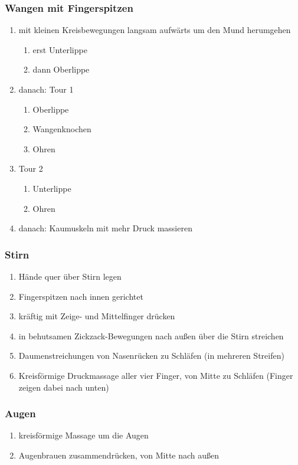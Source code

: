 \subsubsection{Wangen mit Fingerspitzen}
\begin{enumerate}
\item mit kleinen Kreisbewegungen langsam aufwärts um den Mund herumgehen
	\begin{enumerate}
	\item erst Unterlippe
	\item dann Oberlippe
	\end{enumerate}
\item danach: Tour 1
	\begin{enumerate}
	\item Oberlippe
	\item Wangenknochen
	\item Ohren
	\end{enumerate}
\item Tour 2
	\begin{enumerate}
	\item Unterlippe
	\item Ohren
	\end{enumerate}
\item danach: Kaumuskeln mit mehr Druck massieren
\end{enumerate}

\subsubsection{Stirn}
\begin{enumerate}
\item Hände quer über Stirn legen
\item Fingerspitzen nach innen gerichtet
\item kräftig mit Zeige- und Mittelfinger drücken
\item in behutsamen Zickzack-Bewegungen nach außen über die Stirn streichen
\item Daumenstreichungen von Nasenrücken zu Schläfen (in mehreren Streifen)
\item Kreisförmige Druckmassage aller vier Finger, von Mitte zu Schläfen (Finger zeigen dabei nach unten)
\end{enumerate}

\subsubsection{Augen}
\begin{enumerate}
\item kreisförmige Massage um die Augen
\item Augenbrauen zusammendrücken, von Mitte nach außen
\end{enumerate}

